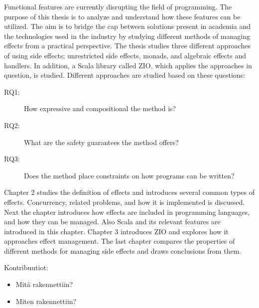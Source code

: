 Functional features are currently disrupting the field of programming. The purpose of this thesis is to analyze and understand how these features can be utilized. The aim is to bridge the cap between solutions present in academia and the technologies used in the industry by studying different methods of managing effects from a practical perspective. The thesis studies three different approaches of using side effects; unrestricted side effects, monads, and algebraic effects and handlers. In addition, a Scala library called ZIO, which applies the approaches in question, is studied. Different approaches are studied based on these questions:
\begin{description}
    \item[RQ1:] How expressive and compositional the method is?
    \item[RQ2:] What are the safety guarantees the method offers?
    \item[RQ3:] Does the method place constraints on how programs can be written?
\end{description}

Chapter 2 studies the definition of effects and introduces several common types of effects. Concurrency, related problems, and how it is implemented is discussed. Next the chapter introduces how effects are included in programming languages, and how they can be managed. Also Scala and its relevant features are introduced in this chapter. Chapter 3 introduces ZIO and explores how it approaches effect management.  The last chapter compares the properties of different methods for managing side effects and draws conclusions from them.

Kontribuutiot:
\begin{itemize}
    \item Mitä rakennettiin?
    \item Miten rakennettiin?
\end{itemize}
